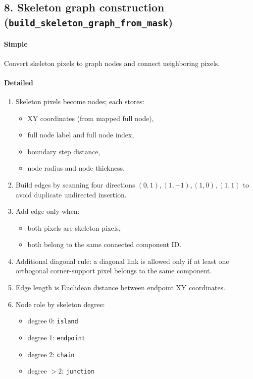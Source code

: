 \documentclass[11pt]{article}
\begin{document}
\subsection*{8. Skeleton graph construction (\texttt{build\_skeleton\_graph\_from\_mask})}
\paragraph{Simple}
Convert skeleton pixels to graph nodes and connect neighboring pixels.

\paragraph{Detailed}
\begin{enumerate}
  \item Skeleton pixels become nodes; each stores:
  \begin{itemize}
    \item XY coordinates (from mapped full node),
    \item full node label and full node index,
    \item boundary step distance,
    \item node radius and node thickness.
  \end{itemize}
  \item Build edges by scanning four directions
  \((0,1),(1,-1),(1,0),(1,1)\) to avoid duplicate undirected insertion.
  \item Add edge only when:
  \begin{itemize}
    \item both pixels are skeleton pixels,
    \item both belong to the same connected component ID.
  \end{itemize}
  \item Additional diagonal rule:
  a diagonal link is allowed only if at least one orthogonal corner-support
  pixel belongs to the same component.
  \item Edge length is Euclidean distance between endpoint XY coordinates.
  \item Node role by skeleton degree:
  \begin{itemize}
    \item degree 0: \texttt{island}
    \item degree 1: \texttt{endpoint}
    \item degree 2: \texttt{chain}
    \item degree $>2$: \texttt{junction}
  \end{itemize}
\end{enumerate}
\end{document}
